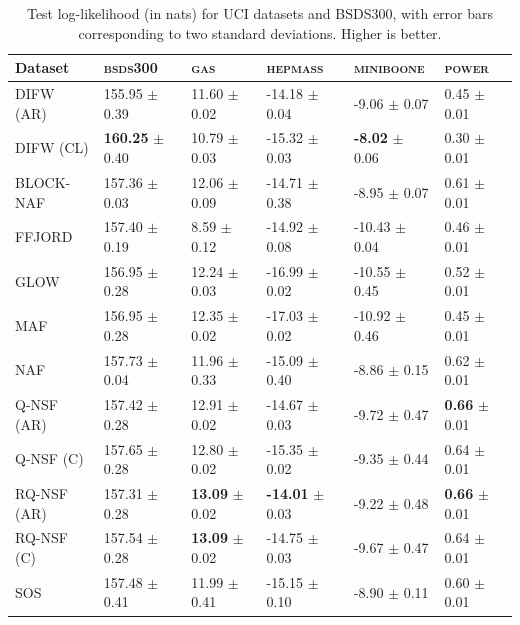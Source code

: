 \vspace{-0.5cm}
\begin{table}[!htb]
  \small
  \caption{Test log-likelihood (in nats) for UCI datasets and BSDS300, with error bars corresponding to two standard deviations. Higher is better.}
  \label{tab:nf_nd_results}
  \vspace{-1em}
  \begin{center}
  \begin{tabular}{llllll}
    \toprule
    Dataset &  \textsc{bsds300} & \textsc{gas} & \textsc{hepmass} & \textsc{miniboone} & \textsc{power} \\
    \midrule
    DIFW (AR)    &  155.95 $\pm$ 0.39 &  11.60 $\pm$ 0.02 &  -14.18 $\pm$ 0.04 &   -9.06 $\pm$ 0.07 &  0.45 $\pm$ 0.01 \\
    DIFW (CL)    &  \textbf{160.25} $\pm$ 0.40 &  10.79 $\pm$ 0.03 &  -15.32 $\pm$ 0.03 &   \textbf{-8.02} $\pm$ 0.06 &  0.30 $\pm$ 0.01 \\
    BLOCK-NAF    &  157.36 $\pm$ 0.03 &  12.06 $\pm$ 0.09 &  -14.71 $\pm$ 0.38 &   -8.95 $\pm$ 0.07 &  0.61 $\pm$ 0.01 \\
    FFJORD       &  157.40 $\pm$ 0.19 &   8.59 $\pm$ 0.12 &  -14.92 $\pm$ 0.08 &  -10.43 $\pm$ 0.04 &  0.46 $\pm$ 0.01 \\
    GLOW         &  156.95 $\pm$ 0.28 &  12.24 $\pm$ 0.03 &  -16.99 $\pm$ 0.02 &  -10.55 $\pm$ 0.45 &  0.52 $\pm$ 0.01 \\
    MAF          &  156.95 $\pm$ 0.28 &  12.35 $\pm$ 0.02 &  -17.03 $\pm$ 0.02 &  -10.92 $\pm$ 0.46 &  0.45 $\pm$ 0.01 \\
    NAF          &  157.73 $\pm$ 0.04 &  11.96 $\pm$ 0.33 &  -15.09 $\pm$ 0.40 &   -8.86 $\pm$ 0.15 &  0.62 $\pm$ 0.01 \\
    Q-NSF (AR)   &  157.42 $\pm$ 0.28 &  12.91 $\pm$ 0.02 &  -14.67 $\pm$ 0.03 &   -9.72 $\pm$ 0.47 &  \textbf{0.66} $\pm$ 0.01 \\
    Q-NSF (C)    &  157.65 $\pm$ 0.28 &  12.80 $\pm$ 0.02 &  -15.35 $\pm$ 0.02 &   -9.35 $\pm$ 0.44 &  0.64 $\pm$ 0.01 \\
    RQ-NSF (AR)  &  157.31 $\pm$ 0.28 &  \textbf{13.09} $\pm$ 0.02 &  \textbf{-14.01} $\pm$ 0.03 &   -9.22 $\pm$ 0.48 &  \textbf{0.66} $\pm$ 0.01 \\
    RQ-NSF (C)   &  157.54 $\pm$ 0.28 &  \textbf{13.09} $\pm$ 0.02 &  -14.75 $\pm$ 0.03 &   -9.67 $\pm$ 0.47 &  0.64 $\pm$ 0.01 \\
    SOS          &  157.48 $\pm$ 0.41 &  11.99 $\pm$ 0.41 &  -15.15 $\pm$ 0.10 &   -8.90 $\pm$ 0.11 &  0.60 $\pm$ 0.01 \\\bottomrule
  \end{tabular}
\end{center}
\end{table}


